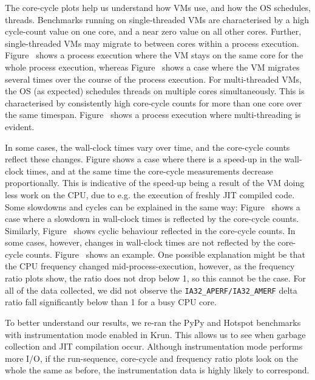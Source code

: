 \documentclass[preprint,numbers,10pt]{sigplanconf}
\newcommand{\krun}{Krun\xspace}
\begin{document}
The core-cycle plots help us understand how VMs use, and how the OS schedules,
threads. Benchmarks running on single-threaded VMs are characterised by a high
cycle-count value on one core, and a near zero value on all other cores.
Further, single-threaded VMs may migrate to between cores within a process
execution. Figure~ shows a process execution where the VM stays on the
same core for the whole process execution, whereas Figure~ shows a
case where the VM migrates several times over the course of the process
execution. For multi-threaded VMs, the OS (as expected) schedules threads on
multiple cores simultaneously. This is characterised by consistently high
core-cycle counts for more than one core over the same timespan.
Figure~ shows a process execution where multi-threading is evident.

In some cases, the wall-clock times vary over time, and the core-cycle counts
reflect these changes. Figure shows a case where there is a speed-up
in the wall-clock times, and at the same time the core-cycle measurements
decrease proportionally. This is indicative of the speed-up being a result of
the VM doing less work on the CPU, due to e.g. the execution of freshly JIT
compiled code. Some slowdowns and cycles can be explained in the same way:
Figure~ shows a case where a slowdown in wall-clock times is reflected
by the core-cycle counts. Similarly, Figure~ shows cyclic behaviour
reflected in the core-cycle counts. In some cases, however, changes in
wall-clock times are not reflected by the core-cycle counts. Figure~
shows an example. One possible explanation might be that the CPU frequency
changed mid-process-execution, however, as the frequency ratio plots show, the
ratio does not drop below 1, so this cannot be the case. For all of the data
collected, we did not observe the \texttt{IA32\_APERF/IA32\_AMERF} delta ratio
fall significantly below than 1 for a busy CPU core.

To better understand our results, we re-ran the PyPy and Hotspot benchmarks
with instrumentation mode enabled in \krun. This allows us to see when garbage
collection and JIT compilation occur. Although instrumentation mode performs
more I/O, if the run-sequence, core-cycle and frequency ratio plots look on the
whole the same as before, the instrumentation data is highly likely to
correspond. 

\end{document}
